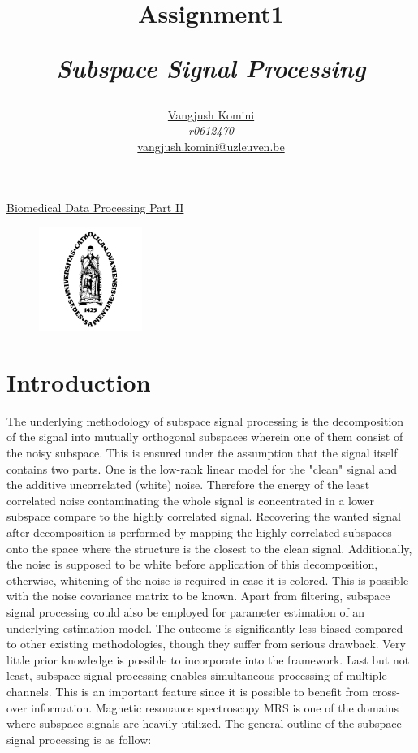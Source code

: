 \documentclass[a4paper]{article}
\title{Assignment1\\\centerline{\textit{Subspace Signal Processing}} }
\author{
\href{mailto:vangjush.komini@uzleuven.be}{Vangjush Komini}\\  \textit{r0612470} \\
\href{mailto:vangjush.komini@uzleuven.be}{vangjush.komini@uzleuven.be}\\
}
\numberwithin{equation}{subsection}
\numberwithin{figure}{subsection}
\begin{document}
\maketitle
\begin{center}
\Large \href{https://onderwijsaanbod.kuleuven.be/syllabi/e/H06W1AE.htm#activetab=doelstellingen_idp41200}{Biomedical Data Processing Part II}
\end{center}

\begin{figure}[!htbp]
\centering
\includegraphics[width=0.3\textwidth]{icon2.png}
\end{figure}

\newpage
\section{Introduction}

The underlying methodology of subspace signal processing is the decomposition of the signal into mutually orthogonal subspaces wherein one of them consist of the noisy subspace. This is ensured under the assumption that the signal itself contains two parts. One is the low-rank linear model for the "clean" signal and the additive uncorrelated (white) noise. Therefore the energy of the least correlated noise contaminating the whole signal is concentrated in a lower subspace compare to the highly correlated signal. Recovering the wanted signal after decomposition is performed by mapping the highly correlated subspaces onto the space where the structure is the closest to the clean signal. Additionally, the noise is supposed to be white before application of this decomposition, otherwise, whitening of the noise is required in case it is colored. This is possible with the noise covariance matrix to be known. Apart from filtering, subspace signal processing could also be employed for parameter estimation of an underlying estimation model. The outcome is significantly less biased compared to other existing methodologies, though they suffer from serious drawback. Very little prior knowledge is possible to incorporate into the framework. Last but not least, subspace signal processing enables simultaneous processing of multiple channels. This is an important feature since it is possible to benefit from cross-over information. Magnetic resonance spectroscopy MRS is one of the domains where subspace signals are heavily utilized. The general outline of the subspace signal processing is as follow:
\end{document}
